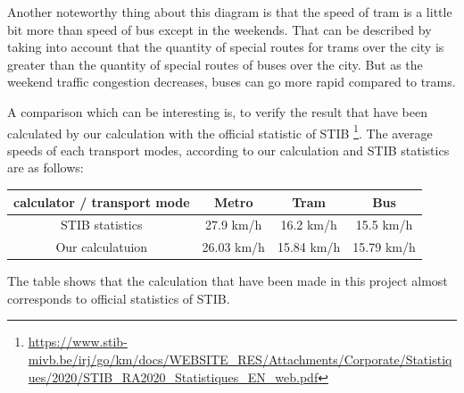 \documentclass{article}
\begin{document}
Another noteworthy thing about this diagram is that the speed of tram is a little bit more than speed of bus except in the weekends. That can be described by taking into account that the quantity of special routes for trams over the city is greater than the quantity of special routes of buses over the city. But as the weekend traffic congestion decreases, buses can go more rapid compared to trams.

A comparison which can be interesting is, to verify the result that have been calculated by our calculation with the official statistic of STIB \footnote{\url{https://www.stib-mivb.be/irj/go/km/docs/WEBSITE_RES/Attachments/Corporate/Statistiques/2020/STIB_RA2020_Statistiques_EN_web.pdf}}. The average speeds of each transport modes, according to our calculation and STIB statistics are as follows:
\begin{table}[H]
\begin{center}
\begin{tabular}{|c|c|c|c|}
\hline
calculator / transport mode & Metro      & Tram       & Bus        \\ \hline
STIB statistics             & 27.9 km/h  & 16.2 km/h  & 15.5 km/h  \\ \hline
Our calculatuion             & 26.03 km/h & 15.84 km/h & 15.79 km/h \\ \hline
\end{tabular}
\end{center}
\end{table}

The table shows that the calculation that have been made in this project almost corresponds to official statistics of STIB. 
\end{document}
